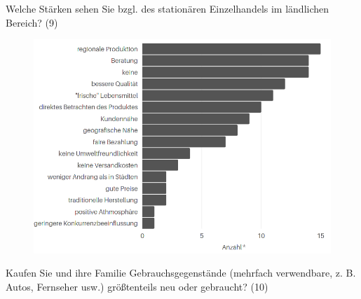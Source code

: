 \newpage\noindent Welche Stärken sehen Sie bzgl. des stationären Einzelhandels im ländlichen Bereich? (9)\\
\begin{figure}[H]
    \begin{center}
        \includegraphics[width=15cm]{media/schuelerumfrage/9.png}
    \end{center}
\end{figure}

\noindent Kaufen Sie und ihre Familie Gebrauchsgegenstände (mehrfach verwendbare, z. B. Autos, Fernseher usw.) größtenteils neu oder gebraucht? (10)\\

